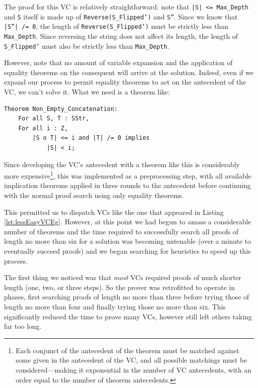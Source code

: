 

The proof for this VC is relatively straightforward: note that \texttt{|S| <= Max\_Depth} and \texttt{S} itself is made up of \texttt{Reverse(S\_Flipped')} and \texttt{S''}.  Since we know that \texttt{|S''| /= 0}, the length of \texttt{Reverse(S\_Flipped')} must be strictly less than \texttt{Max\_Depth}.  Since reversing the string does not affect its length, the length of \texttt{S\_Flipped'} must also be strictly less than \texttt{Max\_Depth}.

However, note that no amount of variable expansion and the application of equality theorems on the consequent will arrive at the solution.  Indeed, even if we expand our process to permit equality theorems to act on the antecedent of the VC, we can't solve it.  What we need is a theorem like:

\begin{lstlisting}
Theorem Non_Empty_Concatenation:
    For all S, T : SStr,
    For all i : Z, 
        |S o T| <= i and |T| /= 0 implies
            |S| < i;
\end{lstlisting}

Since developing the VC's antecedent with a theorem like this is considerably more expensive\footnote{Each conjunct of the antecedent of the theorem must be matched against some given in the antecedent of the VC, and all possible matchings must be considered---making it exponential in the number of VC antecedents, with an order equal to the number of theorem antecedents.}, this was implemented as a preprocessing step, with all available implication theorems applied in three rounds to the antecedent before continuing with the normal proof search using only equality theorems.

This permitted us to dispatch VCs like the one that appeared in Listing \ref{lst:lessEasyVCEg}.  However, at this point we had begun to amass a considerable number of theorems and the time required to successfully search all proofs of length no more than six for a solution was becoming untenable (over a minute to eventually succeed proofs) and we began searching for heuristics to speed up this process.

The first thing we noticed was that \emph{most} VCs required proofs of much shorter length (one, two, or three steps).  So the prover was retrofitted to operate in phases, first searching proofs of length no more than three before trying those of length no more than four and finally trying those no more than six.  This significantly reduced the time to prove many VCs, however still left others taking far too long.

